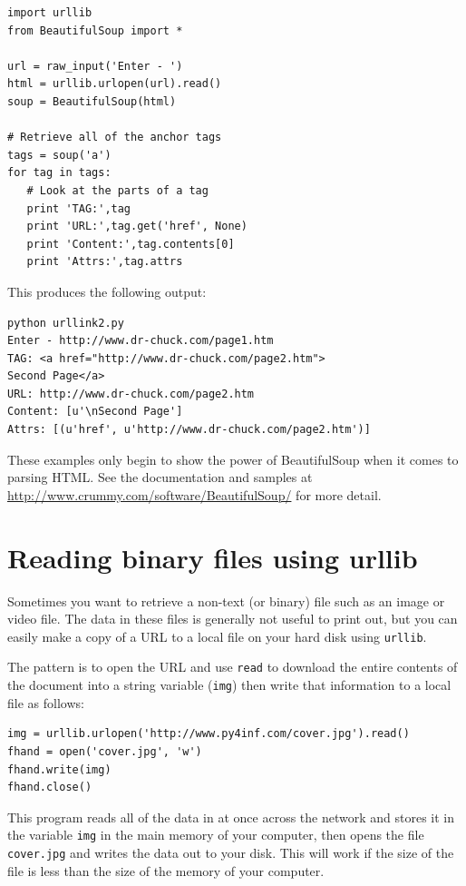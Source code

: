\beforeverb
\begin{verbatim}
import urllib
from BeautifulSoup import *

url = raw_input('Enter - ')
html = urllib.urlopen(url).read()
soup = BeautifulSoup(html)

# Retrieve all of the anchor tags
tags = soup('a')
for tag in tags:
   # Look at the parts of a tag
   print 'TAG:',tag
   print 'URL:',tag.get('href', None)
   print 'Content:',tag.contents[0]
   print 'Attrs:',tag.attrs
\end{verbatim}
\afterverb
%
This produces the following output:

\beforeverb
\begin{verbatim}
python urllink2.py 
Enter - http://www.dr-chuck.com/page1.htm
TAG: <a href="http://www.dr-chuck.com/page2.htm">
Second Page</a>
URL: http://www.dr-chuck.com/page2.htm
Content: [u'\nSecond Page']
Attrs: [(u'href', u'http://www.dr-chuck.com/page2.htm')]
\end{verbatim}
\afterverb
%
These examples only begin to show the power of BeautifulSoup
when it comes to parsing HTML.  See the documentation 
and samples at
\url{http://www.crummy.com/software/BeautifulSoup/} for more detail.

\section{Reading binary files using urllib}

Sometimes you want to retrieve a non-text (or binary) file such as
an image or video file. The data in these files is generally not 
useful to print out, but you can easily make a copy of a URL to a local
file on your hard disk using {\tt urllib}.

The pattern is to open the URL and use {\tt read} to download the entire
contents of the document into a string variable ({\tt img}) then write that
information to a local file as follows:

\beforeverb
\begin{verbatim}
img = urllib.urlopen('http://www.py4inf.com/cover.jpg').read()
fhand = open('cover.jpg', 'w')
fhand.write(img)
fhand.close()
\end{verbatim}
\afterverb
%
This program reads all of the data in at once across the network and 
stores it in the variable {\tt img} in the main memory of your computer,
then opens the file {\tt cover.jpg} and writes the data out to your 
disk.  This will work if the size of the file is less than the size
of the memory of your computer.

